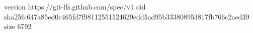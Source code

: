 version https://git-lfs.github.com/spec/v1
oid sha256:647a85ed0c465fd7f98112551524629edd5ad95b333808953817fb766c2aed39
size 6792
